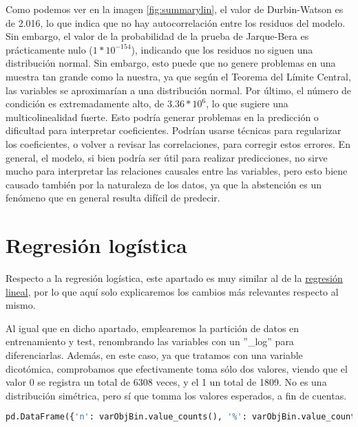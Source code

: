 \documentclass[a4paper,onecolumn]{extarticle}
\let\stdsection\section
\renewcommand\section{\newpage\stdsection}
\begin{document}
\begin{sloppypar}
Como podemos ver en la imagen \ref{fig:summarylin}, el valor de Durbin-Watson es de 2.016, lo que indica que no hay autocorrelación entre los residuos del modelo.
Sin embargo, el valor de la probabilidad de la prueba de Jarque-Bera es prácticamente nulo ($1*10^{-154}$), indicando que los residuos no siguen una distribución normal.
Sin embargo, esto puede que no genere problemas en una muestra tan grande como la nuestra, ya que según el Teorema del Límite Central, las variables se 
aproximarían a una distribución normal. Por último, el número de condición es extremadamente alto, de $3.36*10^6$, lo que sugiere una multicolinealidad fuerte.
Esto podría generar problemas en la predicción o dificultad para interpretar coeficientes. Podrían usarse técnicas para regularizar los coeficientes, o volver
a revisar las correlaciones, para corregir estos errores. En general, el modelo, si bien podría ser útil para realizar predicciones, no sirve mucho para 
interpretar las relaciones causales entre las variables, pero esto biene causado también por la naturaleza de los datos, ya que la abstención es un fenómeno 
que en general resulta difícil de predecir.

\section{Regresión logística}\label{logistica}
Respecto a la regresión logística, este apartado es muy similar al de la \hyperref[lineal]{regresión lineal}, por lo que aquí solo explicaremos los cambios 
más relevantes respecto al mismo.

Al igual que en dicho apartado, emplearemos la partición de datos en entrenamiento y test, renombrando las variables con un ''\_log'' para diferenciarlas. 
Además, en este caso, ya que tratamos con una variable dicotómica, comprobamos que efectivamente toma sólo dos valores, viendo que el valor 0 se registra un total de 6308 veces, y el 1 un total de 1809. No es una distribución simétrica,
pero sí que tomma los valores esperados, a fin de cuentas.
\begin{lstlisting}[language=Python, numbers=none]
pd.DataFrame({'n': varObjBin.value_counts(), '%': varObjBin.value_counts(normalize = True)})
\end{lstlisting}


\end{sloppypar}
\end{document}

